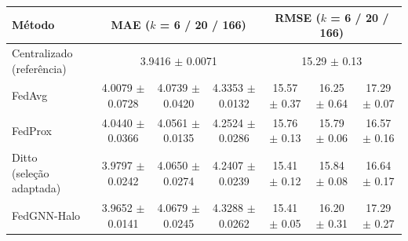 
\begin{tabular}{lcccccc}
\toprule
Método & \multicolumn{3}{c}{MAE ($k$ = 6 / 20 / 166)} & \multicolumn{3}{c}{RMSE ($k$ = 6 / 20 / 166)} \\
\midrule
Centralizado (referência) & \multicolumn{3}{c}{\num{3.9416} $\pm$ \num{0.0071}} & \multicolumn{3}{c}{\num{15.29} $\pm$ \num{0.13}} \\
FedAvg & \num{4.0079} $\pm$ \num{0.0728} & \num{4.0739} $\pm$ \num{0.0420} & \num{4.3353} $\pm$ \num{0.0132} & \num{15.57} $\pm$ \num{0.37} & \num{16.25} $\pm$ \num{0.64} & \num{17.29} $\pm$ \num{0.07} \\
FedProx & \num{4.0440} $\pm$ \num{0.0366} & \num{4.0561} $\pm$ \num{0.0135} & \num{4.2524} $\pm$ \num{0.0286} & \num{15.76} $\pm$ \num{0.13} & \num{15.79} $\pm$ \num{0.06} & \num{16.57} $\pm$ \num{0.16} \\
\shortstack[l]{Ditto\\(seleção adaptada)} & \num{3.9797} $\pm$ \num{0.0242} & \num{4.0650} $\pm$ \num{0.0274} & \num{4.2407} $\pm$ \num{0.0239} & \num{15.41} $\pm$ \num{0.12} & \num{15.84} $\pm$ \num{0.08} & \num{16.64} $\pm$ \num{0.17} \\
FedGNN-Halo & \num{3.9652} $\pm$ \num{0.0141} & \num{4.0679} $\pm$ \num{0.0245} & \num{4.3288} $\pm$ \num{0.0262} & \num{15.41} $\pm$ \num{0.05} & \num{16.20} $\pm$ \num{0.31} & \num{17.29} $\pm$ \num{0.27} \\
\bottomrule
\end{tabular}
